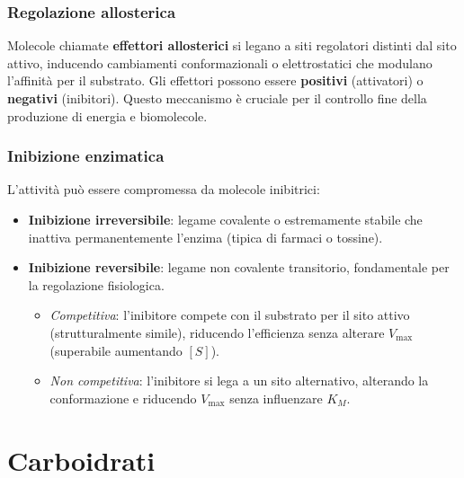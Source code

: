 \documentclass[12pt,a4paper]{report}
\begin{document}
\subsection{Regolazione allosterica}
Molecole chiamate \textbf{effettori allosterici} si legano a siti regolatori distinti dal sito attivo, inducendo cambiamenti conformazionali o elettrostatici che modulano l'affinità per il substrato. Gli effettori possono essere \textbf{positivi} (attivatori) o \textbf{negativi} (inibitori). Questo meccanismo è cruciale per il controllo fine della produzione di energia e biomolecole.
\subsection{Inibizione enzimatica}
L'attività può essere compromessa da molecole inibitrici:
\begin{itemize}
\item \textbf{Inibizione irreversibile}: legame covalente o estremamente stabile che inattiva permanentemente l'enzima (tipica di farmaci o tossine).
\item \textbf{Inibizione reversibile}: legame non covalente transitorio, fondamentale per la regolazione fisiologica.
\begin{itemize}
    \item \textit{Competitiva}: l'inibitore compete con il substrato per il sito attivo (strutturalmente simile), riducendo l'efficienza senza alterare \(V_{\max}\) (superabile aumentando \([S]\)).
    \item \textit{Non competitiva}: l'inibitore si lega a un sito alternativo, alterando la conformazione e riducendo \(V_{\max}\) senza influenzare \(K_M\).
\end{itemize}
\end{itemize}

\chapter{Carboidrati}
\end{document}
